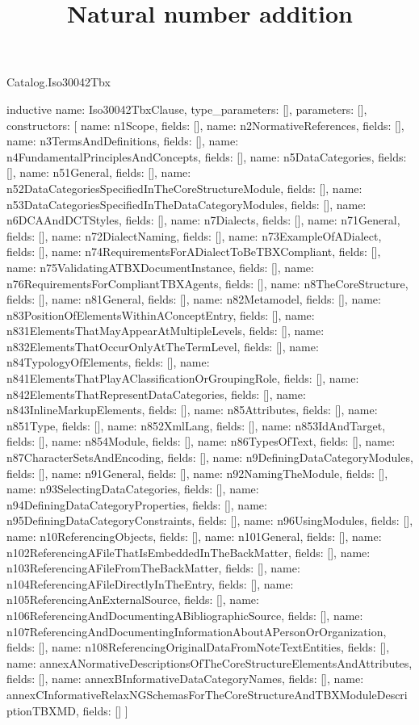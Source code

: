 \begin{lexlean}{Catalog.Iso30042Tbx}
\title{Natural number addition}
\begin{semanticmodule}
inductive{
  name: Iso30042TbxClause,
  type_parameters: [],
  parameters: [],
  constructors: [
    {name: n1Scope, fields: []},
    {name: n2NormativeReferences, fields: []},
    {name: n3TermsAndDefinitions, fields: []},
    {name: n4FundamentalPrinciplesAndConcepts, fields: []},
    {name: n5DataCategories, fields: []},
    {name: n51General, fields: []},
    {name: n52DataCategoriesSpecifiedInTheCoreStructureModule, fields: []},
    {name: n53DataCategoriesSpecifiedInTheDataCategoryModules, fields: []},
    {name: n6DCAAndDCTStyles, fields: []},
    {name: n7Dialects, fields: []},
    {name: n71General, fields: []},
    {name: n72DialectNaming, fields: []},
    {name: n73ExampleOfADialect, fields: []},
    {name: n74RequirementsForADialectToBeTBXCompliant, fields: []},
    {name: n75ValidatingATBXDocumentInstance, fields: []},
    {name: n76RequirementsForCompliantTBXAgents, fields: []},
    {name: n8TheCoreStructure, fields: []},
    {name: n81General, fields: []},
    {name: n82Metamodel, fields: []},
    {name: n83PositionOfElementsWithinAConceptEntry, fields: []},
    {name: n831ElementsThatMayAppearAtMultipleLevels, fields: []},
    {name: n832ElementsThatOccurOnlyAtTheTermLevel, fields: []},
    {name: n84TypologyOfElements, fields: []},
    {name: n841ElementsThatPlayAClassificationOrGroupingRole, fields: []},
    {name: n842ElementsThatRepresentDataCategories, fields: []},
    {name: n843InlineMarkupElements, fields: []},
    {name: n85Attributes, fields: []},
    {name: n851Type, fields: []},
    {name: n852XmlLang, fields: []},
    {name: n853IdAndTarget, fields: []},
    {name: n854Module, fields: []},
    {name: n86TypesOfText, fields: []},
    {name: n87CharacterSetsAndEncoding, fields: []},
    {name: n9DefiningDataCategoryModules, fields: []},
    {name: n91General, fields: []},
    {name: n92NamingTheModule, fields: []},
    {name: n93SelectingDataCategories, fields: []},
    {name: n94DefiningDataCategoryProperties, fields: []},
    {name: n95DefiningDataCategoryConstraints, fields: []},
    {name: n96UsingModules, fields: []},
    {name: n10ReferencingObjects, fields: []},
    {name: n101General, fields: []},
    {name: n102ReferencingAFileThatIsEmbeddedInTheBackMatter, fields: []},
    {name: n103ReferencingAFileFromTheBackMatter, fields: []},
    {name: n104ReferencingAFileDirectlyInTheEntry, fields: []},
    {name: n105ReferencingAnExternalSource, fields: []},
    {name: n106ReferencingAndDocumentingABibliographicSource, fields: []},
    {name: n107ReferencingAndDocumentingInformationAboutAPersonOrOrganization, fields: []},
    {name: n108ReferencingOriginalDataFromNoteTextEntities, fields: []},
    {name: annexANormativeDescriptionsOfTheCoreStructureElementsAndAttributes, fields: []},
    {name: annexBInformativeDataCategoryNames, fields: []},
    {name: annexCInformativeRelaxNGSchemasForTheCoreStructureAndTBXModuleDescriptionTBXMD, fields: []}
  ]
}


\end{semanticmodule}
\end{lexlean}
